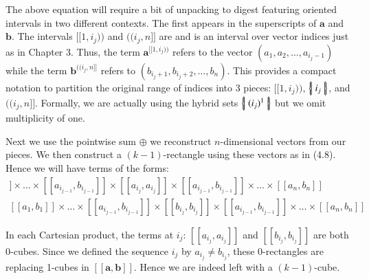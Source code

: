 The above equation will require a bit of unpacking to digest featuring oriented intervals in two different contexts.
The first appears in the superscripts of $\boldsymbol{a}$ and $\boldsymbol{b}$. 
The intervals $[\![1, i_j)\!)$ and $(\!(i_j, n]\!]$ are  and is an interval over vector indices just as in Chapter 3.
Thus, the term $\boldsymbol{a}^{[\![1,i_j)\!)}$ refers to the vector $(a_1, a_2, \ldots, a_{i_j-1})$ 
while the term $\boldsymbol{b}^{(\!(i_j,n]\!]}$ refers to $(b_{i_j+1}, b_{i_j+2}, \ldots, b_{n})$.
This provides a compact notation to partition the original range of indices into 3 pieces: $[\![ 1,i_j )\!)$, $\left\{ \! \left| \; i_j \; \right| \! \right\}$, and $(\!(i_j, n]\!]$.
Formally, we are actually using the hybrid sets $\left\{ \! \left| \; (i_j)^1 \; \right| \! \right\}$ but we omit multiplicity of one.


Next we use the pointwise sum $\oplus$ we reconstruct $n$-dimensional vectors from our pieces.
We then construct a $(k-1)$-rectangle using these vectors as in (4.8).
Hence we will have terms of the forms:
\begin{align}
	[\![a_1, b_1]\!]
	\times \ldots \times
	[\![a_{i_{j-1}}, b_{i_{j-1}}]\!]
	\times
	[\![a_{i_j}, a_{i_j}]\!]
	\times
	[\![a_{i_{j-1}}, b_{i_{j-1}}]\!]
	\times \ldots \times
	[\![a_n, b_n]\!]
	\\
	[\![a_1, b_1]\!]
	\times \ldots \times
	[\![a_{i_{j-1}}, b_{i_{j-1}}]\!]
	\times
	[\![b_{i_j}, b_{i_j}]\!]
	\times
	[\![a_{i_{j-1}}, b_{i_{j-1}}]\!]
	\times \ldots \times
	[\![a_n, b_n]\!]
\end{align}


In each Cartesian product, the terms at $i_j$: $[\![a_{i_j}, a_{i_j}]\!]$ and $[\![b_{i_j}, b_{i_j}]\!]$ are both 0-cubes.
Since we defined the sequence $i_j$ by $a_{i_j} \neq b_{i_j}$, 
these 0-rectangles are replacing 1-cubes in $[\![\boldsymbol{a}, \boldsymbol{b}]\!]$.
Hence we are indeed left with a $(k-1)$-cube.




